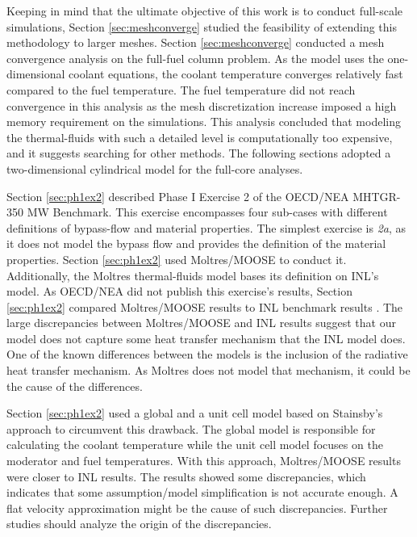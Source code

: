 Keeping in mind that the ultimate objective of this work is to conduct full-scale simulations, Section \ref{sec:meshconverge} studied the feasibility of extending this methodology to larger meshes.
Section \ref{sec:meshconverge} conducted a mesh convergence analysis on the full-fuel column problem.
As the model uses the one-dimensional coolant equations, the coolant temperature converges relatively fast compared to the fuel temperature.
The fuel temperature did not reach convergence in this analysis as the mesh discretization increase imposed a high memory requirement on the simulations.
This analysis concluded that modeling the thermal-fluids with such a detailed level is computationally too expensive, and it suggests searching for other methods.
The following sections adopted a two-dimensional cylindrical model for the full-core analyses.

Section \ref{sec:ph1ex2} described Phase I Exercise 2 of the OECD/NEA MHTGR-350 MW Benchmark.
This exercise encompasses four sub-cases with different definitions of bypass-flow and material properties.
The simplest exercise is \textit{2a}, as it does not model the bypass flow and provides the definition of the material properties.
Section \ref{sec:ph1ex2} used Moltres/MOOSE to conduct it.
Additionally, the Moltres thermal-fluids model bases its definition on INL's model.
As OECD/NEA did not publish this exercise’s results, Section \ref{sec:ph1ex2} compared Moltres/MOOSE results to INL benchmark results \cite{strydom_inl_2013}.
The large discrepancies between Moltres/MOOSE and INL results suggest that our model does not capture some heat transfer mechanism that the INL model does.
One of the known differences between the models is the inclusion of the radiative heat transfer mechanism.
As Moltres does not model that mechanism, it could be the cause of the differences.

Section \ref{sec:ph1ex2} used a global and a unit cell model based on Stainsby's approach \cite{stainsby_investigation_2008} to circumvent this drawback.
The global model is responsible for calculating the coolant temperature while the unit cell model focuses on the moderator and fuel temperatures.
With this approach, Moltres/MOOSE results were closer to INL results.
The results showed some discrepancies, which indicates that some assumption/model simplification is not accurate enough.
A flat velocity approximation might be the cause of such discrepancies.
Further studies should analyze the origin of the discrepancies.

